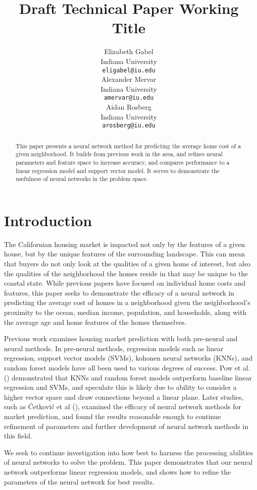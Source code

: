 \documentclass[11pt]{article}
\title{Draft Technical Paper Working Title}
\author{Elizabeth Gabel \\
 Indiana University \\
 \texttt{eligabel@iu.edu} \\\And
 Alexander Mervar \\
 Indiana University \\
 \texttt{amervar@iu.edu} \\\And
 Aidan Rosberg \\
 Indiana University \\
 \texttt{arosberg@iu.edu}\\}
\begin{document}
\maketitle
\begin{abstract}
This paper presents a neural network method for predicting the average home cost of a given neighborhood. It builds from previous work in the area, and refines neural parameters and feature space to increase accuracy, and compares performance to a linear regression model and support vector model. It serves to demonstrate the usefulness of neural networks in the problem space.
\end{abstract}

\section{Introduction}

The Californian housing market is impacted not only by the features of a given house, but by the unique features of the surrounding landscape. This can mean that buyers do not only look at the qualities of a given home of interest, but also the qualities of the neighborhood the homes reside in that may be unique to the coastal state. While previous papers have focused on individual home costs and features, this paper seeks to demonstrate the efficacy of a neural network in predicting the average cost of homes in a neighborhood given the neighborhood’s proximity to the ocean, median income, population, and households, along with the average age and home features of the homes themselves.

Previous work examines housing market prediction with both pre-neural and neural methods. In pre-neural methods, regression models such as linear regression, support vector models (SVMs), kohonen neural networks (KNNs), and random forest models have all been used to various degrees of success. Pow et al. (\citeyear{Pow2014}) demonstrated that KNNs and random forest models outperform baseline linear regression and SVMs, and speculate this is likely due to ability to consider a higher vector space and draw connections beyond a linear plane. Later studies, such as Ćetković et al (\citeyear{Cetkovic2018}), examined the efficacy of neural network methods for market prediction, and found the results reasonable enough to continue refinement of parameters and further development of neural network methods in this field.

We seek to continue investigation into how best to harness the processing abilities of neural networks to solve the problem. This paper demonstrates that our neural network outperforms linear regression models, and shows how to refine the parameters of the neural network for best results.
\end{document}
